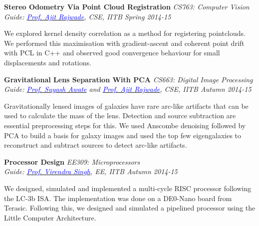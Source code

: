 \documentclass[margin,line]{res}
\newenvironment{list1}{
  \begin{list}{\ding{113}}{%
      \setlength{\itemsep}{0in}
      \setlength{\parsep}{0in} \setlength{\parskip}{0in}
      \setlength{\topsep}{0in} \setlength{\partopsep}{0in} 
      \setlength{\leftmargin}{0.17in}}}{\end{list}}
\begin{document}
\begin{resume}
\vspace*{-0.1in}

{\bf Stereo Odometry Via Point Cloud Registration} \hfill \textit{CS763: Computer Vision}\\
{\em Guide: \href{https://www.cse.iitb.ac.in/~ajitvr}{\textcolor{blue}{Prof. Ajit Rajwade}}, CSE, IITB \hfill Spring 2014-15}\\
\vspace*{-.15in}
\begin{list1}
\item[] We explored kernel density correlation as a method for registering pointclouds. We performed this maximisation with gradient-ascent and coherent point drift with PCL in C++ and observed good convergence behaviour for small displacements and rotations.
\end{list1}

\vspace*{-0.1in}

{\bf Gravitational Lens Separation With PCA} \hfill \textit{CS663: Digital Image Processing}\\
{\em Guide: \href{https://www.cse.iitb.ac.in/~suyash}{\textcolor{blue}{Prof. Suyash Awate}} and \href{https://www.cse.iitb.ac.in/~ajitvr}{\textcolor{blue}{Prof. Ajit Rajwade}}, CSE, IITB \hfill Autumn 2014-15}\\
\vspace*{-.15in}
\begin{list1}
\item[] Gravitationally lensed images of galaxies have rare arc-like artifacts that can be used to calculate the mass of the lens. Detection and source subtraction are essential preprocessing steps for this. We used Anscombe denoising followed by PCA to build a basis for galaxy images and used the top few eigengalaxies to reconstruct and subtract sources to detect arc-like artifacts.
\end{list1}

\vspace*{-0.1in}

{\bf Processor Design} \hfill \textit{EE309: Microprocessors}\\
{\em Guide: \href{https://www.ee.iitb.ac.in/~viren/}{\textcolor{blue}{Prof. Virendra Singh}}, EE, IITB \hfill Autumn 2014-15}\\
\vspace*{-.15in}
\begin{list1}
\item[] We designed, simulated and implemented a multi-cycle RISC processor following the LC-3b ISA. The implementation was done on a DE0-Nano board from Terasic. Following this, we designed and simulated a pipelined processor using the Little Computer Architecture.
\end{list1}


\end{resume}
\end{document}
